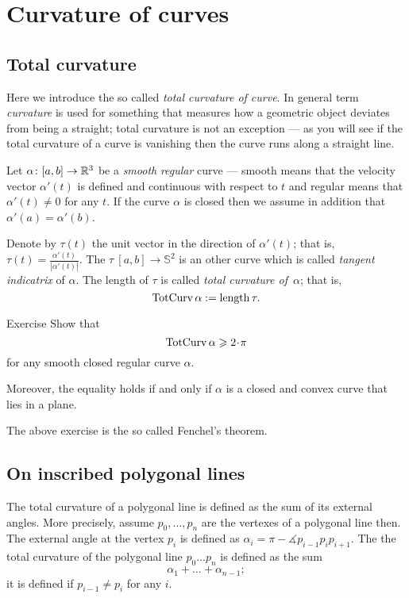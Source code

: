 \chapter{Curvature of curves}

\section{Total curvature}\label{sec:total-curvature-smooth}

Here we introduce the so called \emph{total curvature of curve}.
In general term \emph{curvature} is used for something that measures how 
a geometric object deviates from being a straight;
total curvature is not an exception --- as you will see if the total curvature of a curve is vanishing then the curve runs along a straight line.


Let $\alpha\colon[a,b]\to\mathbb{R}^3$ be a \emph{smooth} \emph{regular} curve --- smooth means that
the velocity vector $\alpha'(t)$ is defined and continuous with respect to $t$ and regular means that $\alpha'(t)\ne 0$ for any $t$.
If the curve $\alpha$ is closed then we assume in addition that $\alpha'(a)=\alpha'(b)$.

Denote by $\tau(t)$ the unit vector in the direction of $\alpha'(t)$;
that is, $\tau(t)=\tfrac{\alpha'(t)}{|\alpha'(t)|}$.
The $\tau\:[a,b]\to\mathbb{S}^2$ is an other curve which is called \emph{tangent indicatrix} of $\alpha$.
The length of $\tau$ is called \emph{total curvature of}~$\alpha$;
that is,
\[\mathop{\rm TotCurv}\nolimits\alpha:=\mathop{\rm length}\nolimits\tau.\]

\begin{thm}{Exercise}\label{ex:fenchel}
Show that 
\[\tc\alpha\ge 2\cdot \pi\]
for any smooth closed regular curve $\alpha$.

Moreover, the equality holds if and only if $\alpha$ is a closed and convex curve that lies in a plane.
\end{thm}

The above exercise is the so called Fenchel's theorem.


\section{On inscribed polygonal lines}

The total curvature of a polygonal line is defined as the sum of its external angles.
More precisely, assume $p_0,\dots,p_n$ are the vertexes of a polygonal line then.
The external angle at the vertex $p_i$ is defined as $\alpha_i=\pi-\measuredangle p_{i-1}p_ip_{i+1}$.
The the total curvature of the polygonal line $p_0\dots p_n$ is defined as the sum
\[\alpha_1+\dots+\alpha_{n-1};\]
it is defined if $p_{i-1}\ne p_i$ for any $i$.

